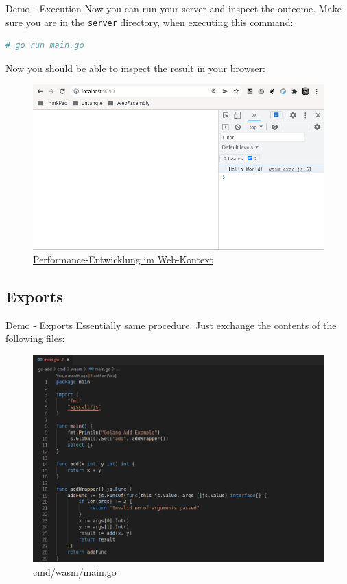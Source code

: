 \documentclass{beamer}
\begin{document}
\begin{frame}[fragile]{Demo - Execution}
    Now you can run your server and inspect the outcome. Make sure you are in the \lstinline{server} directory, when executing this command:
    \begin{lstlisting}[language=bash,basicstyle=\scriptsize]
# go run main.go
\end{lstlisting}

    Now you should be able to inspect the result in your browser:
    \begin{figure}
        \includegraphics[scale=0.2]{./images/demo.png}
        \caption{\href{https://hacks.mozilla.org/2017/02/a-cartoon-intro-to-webassembly/}{Performance-Entwicklung im Web-Kontext}}
    \end{figure}
\end{frame}

\subsection{Exports}

\begin{frame}{Demo - Exports}
    Essentially same procedure. Just exchange the contents of the following files:
    \begin{figure}
        \includegraphics[scale=0.2]{./images/main.png}
        \caption{cmd/wasm/main.go}
    \end{figure}

\end{frame}
\end{document}
